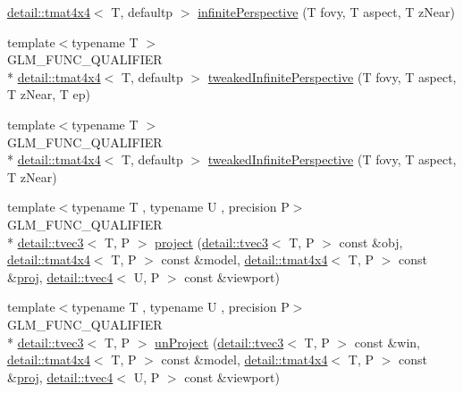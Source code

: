 \begin{DoxyCompactItemize}
\hyperlink{structglm_1_1detail_1_1tmat4x4}{detail\-::tmat4x4}$<$ T, defaultp $>$ \hyperlink{group__gtc__matrix__transform_ga63ba1ddb9c4a08d4e58becd0dc5b725a}{infinite\-Perspective} (T fovy, T aspect, T z\-Near)
\item 
{\footnotesize template$<$typename T $>$ }\\G\-L\-M\-\_\-\-F\-U\-N\-C\-\_\-\-Q\-U\-A\-L\-I\-F\-I\-E\-R \\*
\hyperlink{structglm_1_1detail_1_1tmat4x4}{detail\-::tmat4x4}$<$ T, defaultp $>$ \hyperlink{group__gtc__matrix__transform_gade8abc58c0ac541163e872eb66f3e5de}{tweaked\-Infinite\-Perspective} (T fovy, T aspect, T z\-Near, T ep)
\item 
{\footnotesize template$<$typename T $>$ }\\G\-L\-M\-\_\-\-F\-U\-N\-C\-\_\-\-Q\-U\-A\-L\-I\-F\-I\-E\-R \\*
\hyperlink{structglm_1_1detail_1_1tmat4x4}{detail\-::tmat4x4}$<$ T, defaultp $>$ \hyperlink{group__gtc__matrix__transform_ga9d67732836d71a79dc21eb8f87603cb7}{tweaked\-Infinite\-Perspective} (T fovy, T aspect, T z\-Near)
\item 
{\footnotesize template$<$typename T , typename U , precision P$>$ }\\G\-L\-M\-\_\-\-F\-U\-N\-C\-\_\-\-Q\-U\-A\-L\-I\-F\-I\-E\-R \\*
\hyperlink{structglm_1_1detail_1_1tvec3}{detail\-::tvec3}$<$ T, P $>$ \hyperlink{group__gtc__matrix__transform_ga41227b7b98882dcbaa8dab52df372c7b}{project} (\hyperlink{structglm_1_1detail_1_1tvec3}{detail\-::tvec3}$<$ T, P $>$ const \&obj, \hyperlink{structglm_1_1detail_1_1tmat4x4}{detail\-::tmat4x4}$<$ T, P $>$ const \&model, \hyperlink{structglm_1_1detail_1_1tmat4x4}{detail\-::tmat4x4}$<$ T, P $>$ const \&\hyperlink{group__gtx__projection_gadf29123bcf748fc9d6fb0998192184cf}{proj}, \hyperlink{structglm_1_1detail_1_1tvec4}{detail\-::tvec4}$<$ U, P $>$ const \&viewport)
\item 
{\footnotesize template$<$typename T , typename U , precision P$>$ }\\G\-L\-M\-\_\-\-F\-U\-N\-C\-\_\-\-Q\-U\-A\-L\-I\-F\-I\-E\-R \\*
\hyperlink{structglm_1_1detail_1_1tvec3}{detail\-::tvec3}$<$ T, P $>$ \hyperlink{group__gtc__matrix__transform_ga4b0a9086d15e2a743ecd7b6128146af1}{un\-Project} (\hyperlink{structglm_1_1detail_1_1tvec3}{detail\-::tvec3}$<$ T, P $>$ const \&win, \hyperlink{structglm_1_1detail_1_1tmat4x4}{detail\-::tmat4x4}$<$ T, P $>$ const \&model, \hyperlink{structglm_1_1detail_1_1tmat4x4}{detail\-::tmat4x4}$<$ T, P $>$ const \&\hyperlink{group__gtx__projection_gadf29123bcf748fc9d6fb0998192184cf}{proj}, \hyperlink{structglm_1_1detail_1_1tvec4}{detail\-::tvec4}$<$ U, P $>$ const \&viewport)

\end{DoxyCompactItemize}
